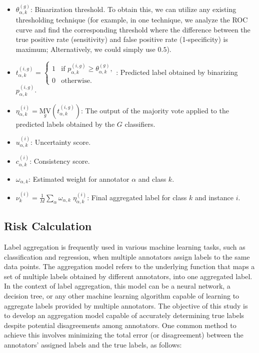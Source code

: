 \begin{itemize}
    \item  $\theta_{\alpha,k}^{(g)} $: Binarization threshold. To obtain this, we can utilize any existing thresholding technique (for example, in one technique, we analyze the ROC curve and find the corresponding threshold where the difference between the true positive rate (sensitivity) and false positive rate (1-specificity) is maximum; Alternatively, we could simply use $0.5 $).

    \item  $t_{\alpha,k}^{(i,g)} =
        \begin{cases}
            1 & \text{if } p_{\alpha,k}^{(i,g)} \geq \theta_{\alpha,k}^{(g)}, \\
            0 & \text{otherwise}.
        \end{cases} $: Predicted label obtained by binarizing $p_{\alpha,k}^{(i,g)} $.

    \item  $\eta_{\alpha,k}^{(i)} = {{\underset g{\mathrm{MV}}}{ \left(t_{\alpha,k}^{(i,g)}\right) }} $: The output of the majority vote applied to the predicted labels obtained by the $G $ classifiers.

    \item  $u_{\alpha,k}^{(i)} $: Uncertainty score.

    \item  $c_{\alpha,k}^{(i)} $: Consistency score.

    \item  $\omega_{\alpha,k} $: Estimated weight for annotator $\alpha $ and class $k $.

    \item  $\nu_k^{(i)}=\frac{1}{{M}}{\sum_{\alpha}{\omega_{\alpha,k} \; \eta_{\alpha,k}^{(i)}}} $: Final aggregated label for class $k $ and instance $i $.

\end{itemize}

\subsection{Risk Calculation}

Label aggregation is frequently used in various machine learning tasks, such as classification and regression, when multiple annotators assign labels to the same data points. The aggregation model refers to the underlying function that maps a set of multiple labels obtained by different annotators, into one aggregated label. In the context of label aggregation, this model can be a neural network, a decision tree, or any other machine learning algorithm capable of learning to aggregate labels provided by multiple annotators. The objective of this study is to develop an aggregation model capable of accurately determining true labels despite potential disagreements among annotators. One common method to achieve this involves minimizing the total error (or disagreement) between the annotators' assigned labels and the true labels, as follows:



